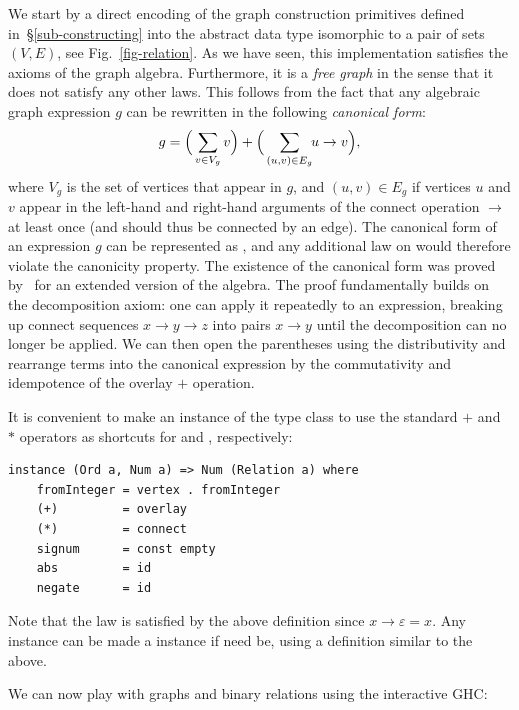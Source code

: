 We start by a direct encoding of the graph construction primitives defined
in~\S\ref{sub-constructing} into the abstract data type  isomorphic
to a pair of sets $(V,E)$, see Fig.~\ref{fig-relation}. As we have seen,
this implementation satisfies the axioms of the graph algebra. Furthermore, it
is a \emph{free graph} in the sense that it does not satisfy any other laws.
This follows from the fact that any algebraic graph expression $g$ can be
rewritten in the following \emph{canonical form}:
\[
g = \Big(\sum_{v\in V_g} v\Big) + \Big(\sum_{(u,v)\in E_g} \hspace{-1mm} u \rightarrow v\Big),
\]
\noindent
where $V_g$ is the set of vertices that appear in $g$, and $(u,v)\in E_g$ if
vertices $u$ and $v$ appear in the left-hand and right-hand arguments of
the connect operation $\rightarrow$ at least once (and should thus be connected
by an edge). The canonical form of an
expression $g$ can be represented as , and any additional
law on  would therefore violate the canonicity property.
The existence of the canonical form was proved by~\citet{2014_algebra_mokhov}
for an extended version of the algebra. The proof fundamentally builds on the
decomposition axiom: one can apply it repeatedly to an expression, breaking up
connect sequences $x\rightarrow y\rightarrow z$ into pairs $x \rightarrow y$
until the decomposition can no longer be applied. We can then open the parentheses
using the distributivity and rearrange terms into the canonical expression
by the commutativity and idempotence of the overlay $+$ operation.

It is convenient to make  an instance of the  type class
to use the standard $+$ and $*$ operators as shortcuts for  and
, respectively:

\begin{verbatim}
instance (Ord a, Num a) => Num (Relation a) where
    fromInteger = vertex . fromInteger
    (+)         = overlay
    (*)         = connect
    signum      = const empty
    abs         = id
    negate      = id
\end{verbatim}

\noindent
Note that the  law  is satisfied by the above
definition since $x \rightarrow \varepsilon = x$. Any  instance
can be made a  instance if need be, using a definition similar to the above.

We can now play with graphs and binary relations using the interactive GHC:

